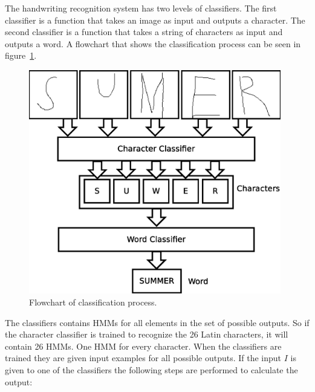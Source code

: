
The handwriting recognition system has two levels of classifiers. The first classifier is a function that takes an image as input and outputs a character. The second classifier is a function that takes a string of characters as input and outputs a word. A flowchart that shows the classification process can be seen in figure~\ref{fig:classification_system_overview}. 

    \begin{figure}[htb] 
      \begin{center}
	\leavevmode
	\includegraphics[width=110mm]{classification_system_overview.eps}%
      \end{center}
      \caption{Flowchart of classification process.}
      \label{fig:classification_system_overview}
    \end{figure}

The classifiers contains HMMs for all elements in the set of possible outputs. So if the character classifier is trained to recognize the 26 Latin characters, it will contain 26 HMMs. One HMM for every character. When the classifiers are trained they are given input examples for all possible outputs. If the input $I$ is given to one of the classifiers the following steps are performed to calculate the output:

